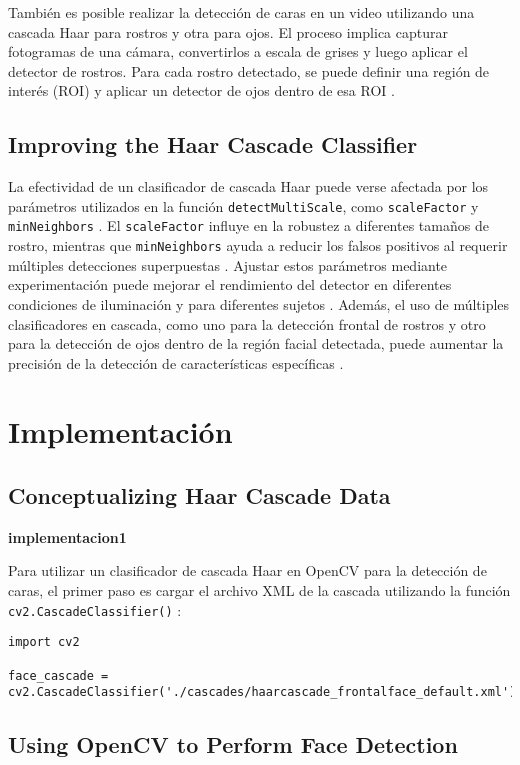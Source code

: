 \documentclass[a4paper]{article}
\begin{document}
También es posible realizar la detección de caras en un video utilizando una cascada Haar para rostros y otra para ojos. El proceso implica capturar fotogramas de una cámara, convertirlos a escala de grises y luego aplicar el detector de rostros. Para cada rostro detectado, se puede definir una región de interés (ROI) y aplicar un detector de ojos dentro de esa ROI .

\subsection{Improving the Haar Cascade Classifier}

La efectividad de un clasificador de cascada Haar puede verse afectada por los parámetros utilizados en la función \texttt{detectMultiScale}, como \texttt{scaleFactor} y \texttt{minNeighbors} . El \texttt{scaleFactor} influye en la robustez a diferentes tamaños de rostro, mientras que \texttt{minNeighbors} ayuda a reducir los falsos positivos al requerir múltiples detecciones superpuestas . Ajustar estos parámetros mediante experimentación puede mejorar el rendimiento del detector en diferentes condiciones de iluminación y para diferentes sujetos . Además, el uso de múltiples clasificadores en cascada, como uno para la detección frontal de rostros y otro para la detección de ojos dentro de la región facial detectada, puede aumentar la precisión de la detección de características específicas .

\section{Implementación}

\subsection{Conceptualizing Haar Cascade Data}

\textbf{implementacion1}

Para utilizar un clasificador de cascada Haar en OpenCV para la detección de caras, el primer paso es cargar el archivo XML de la cascada utilizando la función \texttt{cv2.CascadeClassifier()} :

\begin{verbatim}
import cv2

face_cascade = cv2.CascadeClassifier('./cascades/haarcascade_frontalface_default.xml')
\end{verbatim}

\subsection{Using OpenCV to Perform Face Detection}
\end{document}

